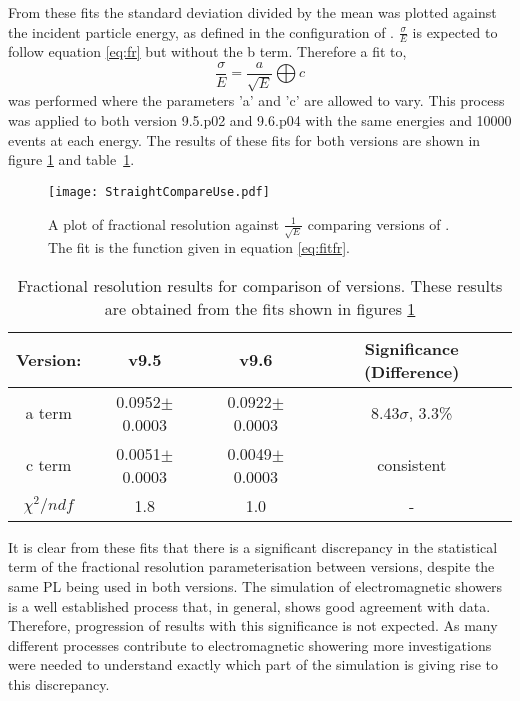 From these fits the standard deviation divided by the mean was plotted against the incident particle energy, as defined in the configuration of \geant.  $\frac{\sigma}{E}$ is expected to follow equation \ref{eq:fr} but without the b term. Therefore a fit to,
\begin{equation}
  \label{eq:fitfr}
  \frac{\sigma}{E}=\frac{a}{\sqrt{E}}\bigoplus c
\end{equation}
was performed where the parameters 'a' and 'c' are allowed to vary.  This process was applied to both \geant version 9.5.p02 and 9.6.p04 with the same energies and 10000 events at each energy.  The results of these fits for both \geant versions are shown in figure \ref{fig:straightres} and table~\ref{tab:results}.
\begin{figure}[h]
  \centering
  \texttt{[image: StraightCompareUse.pdf]}
  \caption{A plot of fractional resolution against $\frac{1}{\sqrt{E}}$ comparing versions of \geant. The fit is the function given in equation \ref{eq:fitfr}.}
  \label{fig:straightres}
\end{figure}

\begin{table}[h]
  \centering
  \begin{tabular}{|c|c|c|c|}
      \hline
      Version: & v9.5 & v9.6 & Significance (Difference)  \\ \hline
      a term    & 0.0952$\pm$0.0003 & 0.0922$\pm$0.0003  & 8.43$\sigma$, 3.3\% \\ \hline
      c term    & 0.0051$\pm$0.0003 & 0.0049$\pm$0.0003 & consistent \\ \hline
      $\chi^2/ndf$   &1.8  & 1.0 &  - \\ \hline
  \end{tabular}
  \caption{Fractional resolution results for comparison of \geant versions.  These results are obtained from the fits shown in figures \ref{fig:straightres}}
  \label{tab:results}
\end{table}

It is clear from these fits that there is a significant discrepancy in the statistical term of the fractional resolution parameterisation between \geant versions, despite the same PL being used in both versions.  The simulation of electromagnetic showers is a well established process that, in general, shows good agreement with data.  Therefore, progression of results with this significance is not expected.  As many different processes contribute to electromagnetic showering more investigations were needed to understand exactly which part of the simulation is giving rise to this discrepancy.

